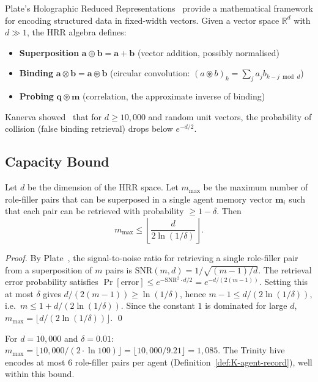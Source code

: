 Plate's Holographic Reduced Representations~\cite{plate_hrr} provide a
mathematical framework for encoding structured data in fixed-width
vectors. Given a vector space $\mathbb{R}^{d}$ with $d \gg 1$, the
HRR algebra defines:
\begin{itemize}
  \item \textbf{Superposition} $\mathbf{a} \oplus \mathbf{b} = \mathbf{a} + \mathbf{b}$
    (vector addition, possibly normalised)
  \item \textbf{Binding} $\mathbf{a} \otimes \mathbf{b} = \mathbf{a} \circledast \mathbf{b}$
    (circular convolution: $(a \circledast b)_k = \sum_{j} a_j b_{k-j \bmod d}$)
  \item \textbf{Probing} $\mathbf{q} \circledast \mathbf{m}$
    (correlation, the approximate inverse of binding)
\end{itemize}
Kanerva showed~\cite{kanerva_hyperdimensional} that for $d \geq 10{,}000$
and random unit vectors, the probability of collision (false binding
retrieval) drops below $e^{-d/2}$.

\subsection{Capacity Bound}
\label{ssec:K-capacity}

\begin{theorem}
\label{thm:K-capacity}
Let $d$ be the dimension of the HRR space. Let $m_{\max}$ be the
maximum number of role-filler pairs that can be superposed in a single
agent memory vector $\mathbf{m}_i$ such that each pair can be retrieved
with probability $\geq 1 - \delta$. Then
\[
  m_{\max} \leq \left\lfloor \frac{d}{2 \ln(1/\delta)} \right\rfloor.
\]
\end{theorem}
\begin{proof}
By Plate~\cite{plate_hrr}, the signal-to-noise ratio for retrieving a
single role-filler pair from a superposition of $m$ pairs is
$\mathrm{SNR}(m, d) = 1 / \sqrt{(m-1)/d}$. The retrieval error
probability satisfies
$\Pr[\text{error}] \leq e^{-\mathrm{SNR}^2 \cdot d / 2} = e^{-d / (2(m-1))}$.
Setting this at most $\delta$ gives $d/(2(m-1)) \geq \ln(1/\delta)$,
hence $m - 1 \leq d/(2\ln(1/\delta))$, i.e.\
$m \leq 1 + d/(2\ln(1/\delta))$. Since the constant $1$ is dominated
for large $d$, $m_{\max} = \lfloor d/(2\ln(1/\delta))\rfloor$.
\qed
\end{proof}

\noindent
For $d = 10{,}000$ and $\delta = 0.01$:
$m_{\max} = \lfloor 10{,}000 / (2 \cdot \ln 100) \rfloor
= \lfloor 10{,}000 / 9.21 \rfloor = 1{,}085$. The Trinity hive encodes
at most 6 role-filler pairs per agent (Definition~\ref{def:K-agent-record}),
well within this bound.

